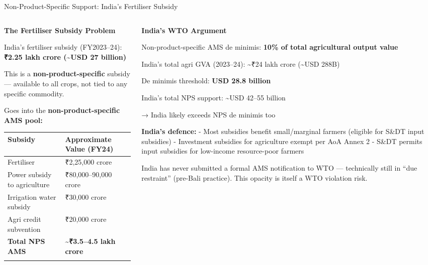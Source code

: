 \documentclass[
  ignorenonframetext,
  aspectratio=169,
]{beamer}
\makeatletter
\let\quarto@originallabel\label
\DeclareRobustCommand*{\label}[1]{\quarto@originallabel{#1}}
\makeatother
\begin{document}
\begin{frame}{Non-Product-Specific Support: India's Fertiliser Subsidy}
\label{non-product-specific-support-indias-fertiliser-subsidy}
\begin{columns}[T]
\begin{column}{0.55\linewidth}
\textbf{The Fertiliser Subsidy Problem}

India's fertiliser subsidy (FY2023--24): \textbf{₹2.25 lakh crore
(\textasciitilde USD 27 billion)}

This is a \textbf{non-product-specific} subsidy --- available to all
crops, not tied to any specific commodity.

Goes into the \textbf{non-product-specific AMS pool:}

\begin{longtable}[]{@{}ll@{}}
\toprule\noalign{}
Subsidy & Approximate Value (FY24) \\
\midrule\noalign{}
\endhead
Fertiliser & ₹2,25,000 crore \\
Power subsidy to agriculture & ₹80,000--90,000 crore \\
Irrigation water subsidy & ₹30,000 crore \\
Agri credit subvention & ₹20,000 crore \\
\textbf{Total NPS AMS} & \textbf{\textasciitilde₹3.5--4.5 lakh crore} \\
\bottomrule\noalign{}
\end{longtable}
\end{column}

\begin{column}{0.45\linewidth}
\textbf{India's WTO Argument}

Non-product-specific AMS de minimis: \textbf{10\% of total agricultural
output value}

India's total agri GVA (2023--24): \textasciitilde₹24 lakh crore
(\textasciitilde USD 288B)

De minimis threshold: \textbf{USD 28.8 billion}

India's total NPS support: \textasciitilde USD 42--55 billion

→ India likely exceeds NPS de minimis too

\textbf{India's defence:} - Most subsidies benefit small/marginal
farmers (eligible for S\&DT input subsidies) - Investment subsidies for
agriculture exempt per AoA Annex 2 - S\&DT permits input subsidies for
low-income resource-poor farmers

India has never submitted a formal AMS notification to WTO ---
technically still in ``due restraint'' (pre-Bali practice). This opacity
is itself a WTO violation risk.
\end{column}
\end{columns}
\end{frame}
\end{document}
